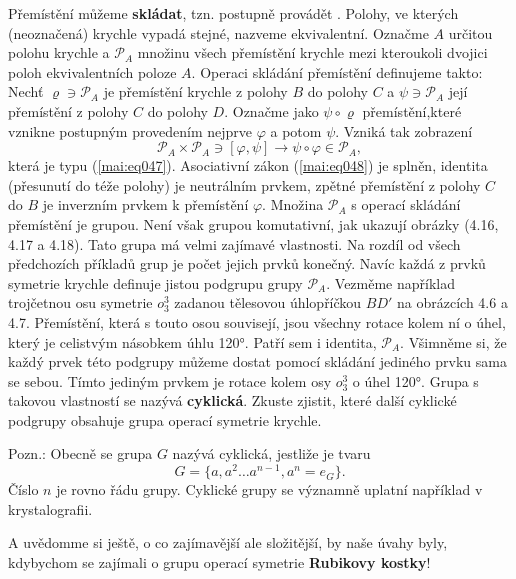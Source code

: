 \begin{example}
    Přemístění můžeme \textbf{skládat}, tzn. postupně provádět . Polohy, ve kterých (neoznačená) 
    krychle vypadá stejné, nazveme ekvivalentní. Označme \(A\) určitou polohu krychle a 
    \(\mathcal{P}_A\) množinu všech přemístění krychle mezi kteroukoli dvojici poloh ekvivalentních 
    poloze \(A\). Operaci skládání přemístění definujeme takto: Nechť \(\varrho\ni\mathcal{P}_A\) 
    je přemístění krychle z polohy \(B\) do polohy \(C\) a \(\psi\ni\mathcal{P}_A\) její přemístění 
    z polohy \(C\) do polohy \(D\). Označme jako \(\psi\circ\varrho\) přemístění,které vznikne 
    postupným provedením nejprve \(\varphi\) a potom \(\psi\). Vzniká tak zobrazení
    \begin{equation*}
      \mathcal{P}_A\times\mathcal{P}_A\ni [\varphi,\psi] 
        \longrightarrow\psi\circ\varphi\in\mathcal{P}_A,
    \end{equation*}
    která je typu (\ref{mai:eq047}). Asociativní zákon (\ref{mai:eq048}) je splněn, identita 
    (přesunutí do téže polohy) je neutrálním prvkem, zpětné přemístění z polohy \(C\) do \(B\) je 
    inverzním prvkem k přemístění \(\varphi\). Množina \(\mathcal{P}_A\) s operací skládání 
    přemístění je grupou. Není však grupou komutativní, jak ukazují obrázky (4.16, 4.17 a 4.18). 
    Tato grupa má velmi zajímavé vlastnosti. Na rozdíl od všech předchozích příkladů grup je počet 
    jejich prvků konečný. Navíc každá z prvků symetrie krychle definuje jistou podgrupu grupy 
    \(\mathcal{P}_A\). Vezměme například trojčetnou osu symetrie \(o_3^3\) zadanou tělesovou 
    úhlopříčkou \(BD'\) na obrázcích 4.6 a 4.7. Přemístění, která s touto osou souvisejí, jsou 
    všechny rotace kolem ní o úhel, který je celistvým násobkem úhlu \ang{120}. Patří sem i 
    identita, \(\mathcal{P}_A\). Všimněme si, že každý prvek této podgrupy můžeme dostat pomocí 
    skládání jediného prvku sama se sebou. Tímto jediným prvkem je rotace kolem osy \(o_3^3\) o 
    úhel \ang{120}. Grupa s takovou vlastností se nazývá \textbf{cyklická}. Zkuste zjistit, 
    které další cyklické podgrupy obsahuje grupa operací symetrie krychle. 
    
    Pozn.: Obecně se grupa \(G\) nazývá cyklická, jestliže je tvaru
    \begin{equation*}
      G = \{a, a^2 \ldots a^{n-1}, a^n = e_G\}.
    \end{equation*}
    Číslo \(n\) je rovno řádu grupy. Cyklické grupy se významně uplatní například v krystalografii.
    
    A uvědomme si ještě, o co zajímavější ale složitější, by naše úvahy byly, kdybychom se zajímali 
    o grupu operací symetrie\textbf{ Rubikovy kostky}! 
  \normalsize
\end{example}